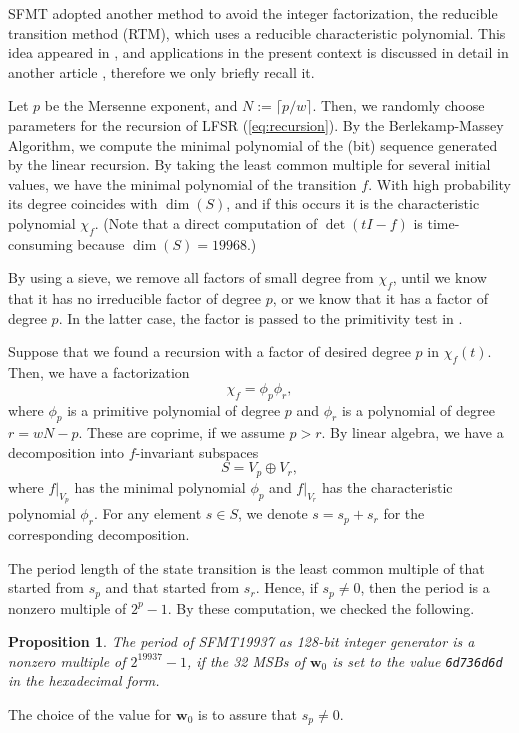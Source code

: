 \documentclass[acmnow]{acmtrans2m}
\newtheorem{proposition}[theorem]{Proposition}
\def\bw{{{\mathbf w}}}
\begin{document}
SFMT adopted
another method to avoid the integer factorization,
the reducible transition method (RTM), 
which uses a reducible characteristic polynomial.
This idea appeared in \cite{FUSHIMI90}
\cite{BRENT}\cite{BRENT-PRIM}, and 
applications in the present context is 
discussed in detail in another article \cite{PMT}, 
therefore we only briefly recall it. 

Let $p$ be the Mersenne exponent, and $N:=\lceil p/w \rceil$.
Then, we randomly choose parameters for the recursion of LFSR
(\ref{eq:recursion}).
By the Berlekamp-Massey Algorithm, 
we compute the minimal polynomial of the (bit) sequence
generated by the linear recursion. By taking the least
common multiple for several initial values, we have the 
minimal polynomial of the transition $f$. With high 
probability its degree coincides with $\dim(S)$, and if 
this occurs it is the characteristic polynomial $\chi_f$. 
(Note that a direct computation of $\det(tI-f)$ is time-consuming
 because $\dim(S)=19968$.)

By using a sieve, we remove all 
factors of small degree from $\chi_f$,
until we know that it has no irreducible factor of degree $p$,
or we know that it has a factor of degree $p$. 
In the latter case, the factor is 
passed to the primitivity test in \cite[\S3.2.2]{knuth:bible}.

Suppose that we found a recursion with a factor of 
desired degree $p$ in $\chi_f(t)$. Then, 
we have a factorization
$$
\chi_f=\phi_p \phi_r,
$$
where $\phi_p$ is a primitive polynomial of degree $p$
and $\phi_r$ is a polynomial of degree $r=wN-p$. These are coprime, 
if we assume $p>r$.
By linear algebra, we have a decomposition into $f$-invariant subspaces
$$
S=V_p \oplus V_r,
$$
where $f|_{V_p}$ has the minimal polynomial $\phi_p$
and $f|_{V_r}$ has the characteristic polynomial $\phi_r$.
For any element $s \in S$, we denote $s=s_p+s_r$ for the corresponding
decomposition. 

The period length of the state transition is the least common multiple
of that started from $s_p$ and that started from $s_r$. Hence, 
if $s_p \neq 0$, then the period is a nonzero multiple of $2^p-1$. 
By these computation, we checked the following. 
\begin{proposition}
The period of SFMT19937 as 128-bit integer generator is 
a nonzero multiple of $2^{19937}-1$, if the 32 MSBs of 
$\bw_0$ is set to 
the value {\tt 6d736d6d} in the hexadecimal form.
\end{proposition}
The choice of the value for $\bw_0$ is to assure that $s_p\neq 0$.
\end{document}
